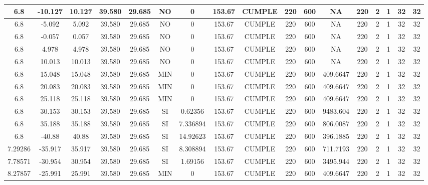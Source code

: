 \begin{table}[h]
{\begin{tabular}{|c|c|c|c|c|c|c|c|c|c|c|c|c|c|c|c|c|}
    \hline
    6.8 & -10.127 & 10.127 & 39.580 & 29.685 & NO  & 0   & 153.67 & CUMPLE & 220 & 600 & NA  & 220 & 2   & 1   & 32  & 32 \bigstrut\\
    \hline
    6.8 & -5.092 & 5.092 & 39.580 & 29.685 & NO  & 0   & 153.67 & CUMPLE & 220 & 600 & NA  & 220 & 2   & 1   & 32  & 32 \bigstrut\\
    \hline
    6.8 & -0.057 & 0.057 & 39.580 & 29.685 & NO  & 0   & 153.67 & CUMPLE & 220 & 600 & NA  & 220 & 2   & 1   & 32  & 32 \bigstrut\\
    \hline
    6.8 & 4.978 & 4.978 & 39.580 & 29.685 & NO  & 0   & 153.67 & CUMPLE & 220 & 600 & NA  & 220 & 2   & 1   & 32  & 32 \bigstrut\\
    \hline
    6.8 & 10.013 & 10.013 & 39.580 & 29.685 & NO  & 0   & 153.67 & CUMPLE & 220 & 600 & NA  & 220 & 2   & 1   & 32  & 32 \bigstrut\\
    \hline
    6.8 & 15.048 & 15.048 & 39.580 & 29.685 & MIN & 0   & 153.67 & CUMPLE & 220 & 600 & 409.6647 & 220 & 2   & 1   & 32  & 32 \bigstrut\\
    \hline
    6.8 & 20.083 & 20.083 & 39.580 & 29.685 & MIN & 0   & 153.67 & CUMPLE & 220 & 600 & 409.6647 & 220 & 2   & 1   & 32  & 32 \bigstrut\\
    \hline
    6.8 & 25.118 & 25.118 & 39.580 & 29.685 & MIN & 0   & 153.67 & CUMPLE & 220 & 600 & 409.6647 & 220 & 2   & 1   & 32  & 32 \bigstrut\\
    \hline
    6.8 & 30.153 & 30.153 & 39.580 & 29.685 & SI  & 0.62356 & 153.67 & CUMPLE & 220 & 600 & 9483.604 & 220 & 2   & 1   & 32  & 32 \bigstrut\\
    \hline
    6.8 & 35.188 & 35.188 & 39.580 & 29.685 & SI  & 7.336894 & 153.67 & CUMPLE & 220 & 600 & 806.0087 & 220 & 2   & 1   & 32  & 32 \bigstrut\\
    \hline
    6.8 & -40.88 & 40.88 & 39.580 & 29.685 & SI  & 14.92623 & 153.67 & CUMPLE & 220 & 600 & 396.1885 & 220 & 2   & 1   & 32  & 32 \bigstrut\\
    \hline
    7.29286 & -35.917 & 35.917 & 39.580 & 29.685 & SI  & 8.308894 & 153.67 & CUMPLE & 220 & 600 & 711.7193 & 220 & 2   & 1   & 32  & 32 \bigstrut\\
    \hline
    7.78571 & -30.954 & 30.954 & 39.580 & 29.685 & SI  & 1.69156 & 153.67 & CUMPLE & 220 & 600 & 3495.944 & 220 & 2   & 1   & 32  & 32 \bigstrut\\
    \hline
    8.27857 & -25.991 & 25.991 & 39.580 & 29.685 & MIN & 0   & 153.67 & CUMPLE & 220 & 600 & 409.6647 & 220 & 2   & 1   & 32  & 32 \bigstrut\\

\end{tabular}}
\end{table}
